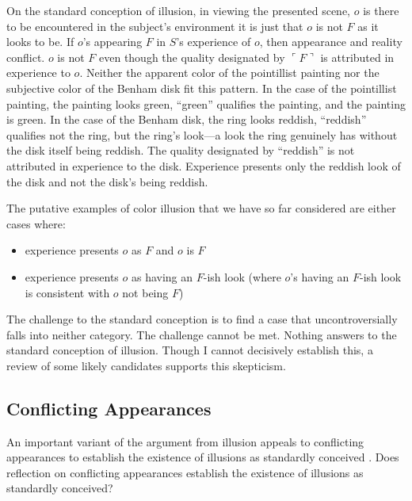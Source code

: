 \documentclass[12pt]{article}
\begin{document}
On the standard conception of illusion, in viewing the presented scene, \( o \) is there to be encountered in the subject's environment it is just that \( o \) is not \( F \) as it looks to be. If \( o \)'s appearing \( F \) in \( S \)'s experience of \( o \), then appearance and reality conflict. \( o \) is not \( F \) even though the quality designated by \( \ulcorner F \urcorner \) is attributed in experience to \( o \).  Neither the apparent color of the pointillist painting nor the subjective color of the Benham disk fit this pattern. In the case of the pointillist painting, the painting looks green, ``green'' qualifies the painting, and the painting is green. In the case of the Benham disk, the ring looks reddish, ``reddish'' qualifies not the ring, but the ring's look---a look the ring genuinely has without the disk itself being reddish. The quality designated by ``reddish'' is not attributed in experience to the disk. Experience presents only the reddish look of the disk and not the disk's being reddish.

The putative examples of color illusion that we have so far considered are either cases where:
\begin{itemize}
	\item experience presents \( o \) as \( F \) and \( o \) is \( F \)
	\item experience presents \( o \) as having an \( F \)-ish look (where \( o \)'s having an \( F \)-ish look is consistent with \( o \) not being \( F \))
\end{itemize}
The challenge to the standard conception is to find a case that uncontroversially falls into neither category. The challenge cannot be met. Nothing answers to the standard conception of illusion. Though I cannot decisively establish this, a review of some likely candidates supports this skepticism.

\subsection{Conflicting Appearances}\label{sub:conflicting_appearances} %

An important variant of the argument from illusion appeals to conflicting appearances to establish the existence of illusions as standardly conceived \citep[see, for example, the version of the argument discussed by][]{Ayer:1956la}. Does reflection on conflicting appearances establish the existence of illusions as standardly conceived?
\end{document}

